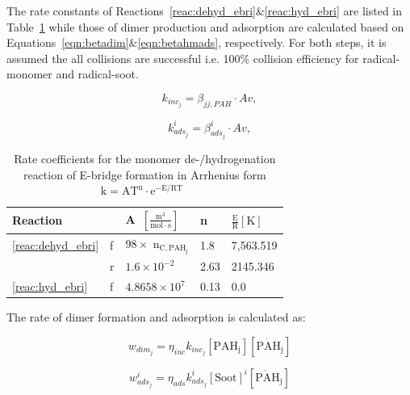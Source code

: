 

The rate constants of Reactions~\eqref{reac:dehyd_ebri}\&\eqref{reac:hyd_ebri} are listed in Table~\ref{tab:Ebridge} while those of dimer production and adsorption are calculated based on Equations~\eqref{eqn:betadim}\&\eqref{eqn:betahmads}, respectively. For both steps, it is assumed the all collisions are successful i.e. 100\% collision efficiency for radical-monomer and radical-soot.

\begin{equation}
	k_{inc_j}=
	\beta_{jj,PAH}\cdot Av
	\label{eqn:kdim_ebri},
\end{equation}

\begin{equation}
	k^i_{ads_{j}}=
	\beta^i_{ads_j}\cdot Av
	\label{eqn:kads_ebir},
\end{equation}

\begin{table}
	\caption{Rate coefficients for the monomer de-/hydrogenation reaction of E-bridge formation in Arrhenius form $\mathrm{k=AT^n\cdot e^{-E/RT}}$~\citep{frenklach2020mechanism}}
	\label{tab:Ebridge}
	\centering
	\begin{tabular}{l l l l l}
		\hline
		Reaction & \hspace{0.1cm} & A~$\mathrm{\left[ \frac{m^3}{mol\cdot s} \right]}$ & n & $\mathrm{\frac{E}{R} [K]}$  \\
		\hline
		\eqref{reac:dehyd_ebri} & f & $98\times$ $\mathrm{n_{C, PAH_j}}$ & 1.8 & 7,563.519 \\
		& r & $1.6\times 10^{-2}$ & 2.63 & 2145.346\\
		\eqref{reac:hyd_ebri} & f & $4.8658\times10^7
		$ & 0.13 & 0.0\\
		\hline
	\end{tabular}
\end{table}

The rate of dimer formation and adsorption is calculated as:

\begin{equation}
	w_{dim_j} = \eta_{inc} k_{inc_{j}} [\mathrm{PAH_j}] [\mathrm{\dot{PAH}_j}]
	\label{eqn:wdim_ebri}
\end{equation}

\begin{equation}
	w^i_{ads_j} = \eta_{ads} k^i_{ads_{j}} [\mathrm{Soot}]^i [\mathrm{\dot{PAH}_j}]
\end{equation}

